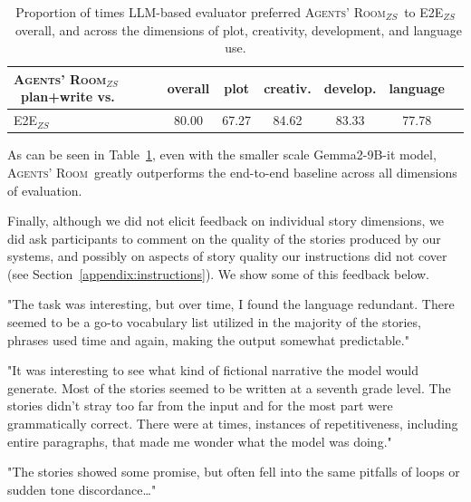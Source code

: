 \documentclass{article}
\newcommand{\Agentsroom}{\textsc{Agents' Room}}
\newcommand{\Agentsroomzs}{\textsc{Agents' Room$_{ZS}$}}
\newcommand{\baselinezs}{{\sc E2E$_{ZS}$}}
\begin{document}
\begin{table}[h!]
\centering
    \begin{tabular}{lcccccc} \toprule
  \Agentsroomzs\  plan+write vs.                         & overall &	plot &	creativ.&
      develop. &	language  \\\midrule
 \baselinezs\ & 	80.00& 	67.27& 	84.62&
83.33 &	77.78 \\ \bottomrule
    \end{tabular}
    \caption{\label{tab:gemma} Proportion of times LLM-based evaluator
       preferred \Agentsroomzs\  to  \baselinezs\ overall, and across the
      dimensions of plot, creativity, development, and language use.}
\end{table}

As can be seen in Table~\ref{tab:gemma}, even with the  smaller scale
Gemma2-9B-it model, \Agentsroom\ greatly
outperforms the end-to-end baseline across all dimensions of
evaluation. 

Finally, although we did not elicit feedback on individual story dimensions, we did ask participants to comment on the quality  of the stories produced by our systems, and possibly on aspects of story quality our instructions did not cover (see Section~\ref{appendix:instructions}). We show some of this feedback below. 

\begin{tcolorbox}[colback=white, colframe=my-yellow, coltitle=black, parskip=5mm, title=
\textbf{Participant Feedback}, breakable]
"The task was interesting, but over time, I found the language redundant. There seemed to be a go-to vocabulary list utilized in the majority of the stories, phrases used time and again, making the output somewhat predictable." \tcbline

"It was interesting to see what kind of fictional narrative the model would generate. Most of the stories seemed to be written at a seventh grade level. The stories didn't stray too far from the input and for the most part were grammatically correct. There were at times, instances of repetitiveness, including entire paragraphs, that made me wonder what the model was doing."\tcbline

"The stories showed some promise, but often fell into the same pitfalls of loops or sudden tone discordance…"
\end{tcolorbox}
\end{document}
